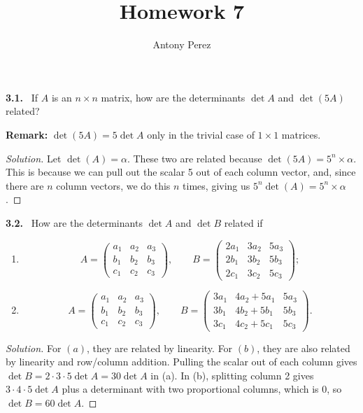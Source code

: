 \documentclass[12pt]{amsart}
\title{Homework 7}
\author{Antony Perez}
\newcommand{\pmat}[1]{\begin{pmatrix}#1\end{pmatrix}}
\theoremstyle{plain}
\theoremstyle{definition}
\theoremstyle{remark}
\newenvironment{problem}[1]{\par\medskip\noindent\textbf{#1.}\ }{\par\smallskip}
\newenvironment{solution}{\begin{proof}[Solution]}{\end{proof}}
\begin{document}
\maketitle

\begin{problem}{3.1}
If $A$ is an $n\times n$ matrix, how are the determinants $\det A$ and $\det(5A)$ related?

\noindent\textbf{Remark:} $\det(5A) = 5\det A$ only in the trivial case of $1\times 1$ matrices.
\end{problem}

\begin{solution}
Let $\det (A) = \alpha$. These two are related because $\det (5A) = 5^n \times \alpha$. This is because we can pull out the scalar 5 out of each column vector, and, since there are $n$ column vectors, we do this $n$ times, giving us $5^n \det (A) = 5^n \times \alpha$.
\end{solution}

\begin{problem}{3.2}
How are the determinants $\det A$ and $\det B$ related if
\begin{enumerate}
  \item
  \[
    A = \pmat{a_1 & a_2 & a_3 \\ b_1 & b_2 & b_3 \\ c_1 & c_2 & c_3}, \qquad
    B = \pmat{2a_1 & 3a_2 & 5a_3 \\ 2b_1 & 3b_2 & 5b_3 \\ 2c_1 & 3c_2 & 5c_3};
  \]
  \item
  \[
    A = \pmat{a_1 & a_2 & a_3 \\ b_1 & b_2 & b_3 \\ c_1 & c_2 & c_3}, \qquad
    B = \pmat{3a_1 & 4a_2 + 5a_1 & 5a_3 \\ 3b_1 & 4b_2 + 5b_1 & 5b_3 \\ 3c_1 & 4c_2 + 5c_1 & 5c_3}.
  \]
\end{enumerate}
\end{problem}

\begin{solution}
    For $(a)$, they are related by linearity. For $(b)$, they are also related by linearity and row/column addition. Pulling the scalar out of each column gives $\det B = 2\cdot 3\cdot 5 \det A = 30\det A$ in (a). In (b), splitting column 2 gives $3\cdot 4\cdot 5\det A$ plus a determinant with two proportional columns, which is 0, so $\det B = 60\det A$.
\end{solution}
\end{document}
